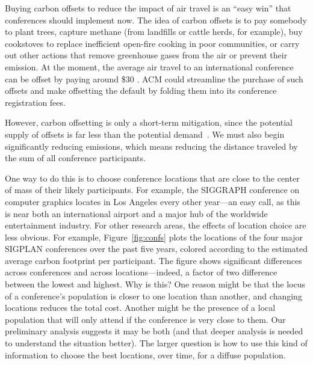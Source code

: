 \documentclass[12pt]{article}
\begin{document}
Buying carbon offsets to reduce the impact of air travel
\cite{CarbonOFfsetReport} is an ``easy win'' that conferences should
implement now.  The idea of carbon offsets is to pay somebody to plant
trees, capture methane (from landfills or cattle herds, for example), buy
cookstoves to replace inefficient open-fire cooking in poor communities, or
carry out other actions that remove greenhouse gases from the air or prevent
their emission. At the moment, the average air travel to an international
conference can be offset by paying around \$30 \cite{CarbonOFfsetReport}.
ACM could streamline the purchase of such offsets and make offsetting the
default by folding them into its conference registration fees.

However, carbon offsetting is only a short-term mitigation, since the
potential supply of offsets is far less than the potential
demand~\cite{SEI-Report}. We must also begin significantly reducing
emissions, which means reducing the distance traveled by the sum of all
conference participants.

One way to do this is to choose conference locations that are close to
the center of mass of their likely participants.  For example, the
SIGGRAPH conference on computer graphics
locates in Los Angeles every other
year---an easy call, as this is near both an international airport and a major hub
of the worldwide entertainment industry. For other research areas, the
effects of location choice are less obvious. For example,
Figure~\ref{fig:confs} plots the 
locations of the four major SIGPLAN conferences over the past five years,
colored according to the estimated average carbon footprint per
participant. The figure shows significant differences across
conferences and across locations---indeed, a factor of two difference
between the 
lowest and highest. Why is this? One reason might be that the locus of a
conference's population is closer to one location than another, and changing
locations reduces the total cost. Another might be the presence of a local
population that will only attend if the conference is very close to
them. Our preliminary analysis suggests it may be both (and that deeper
analysis is needed to understand the situation better). The larger question
is how to use this kind of information to choose the best locations, over
time, for a diffuse population.
\end{document}
